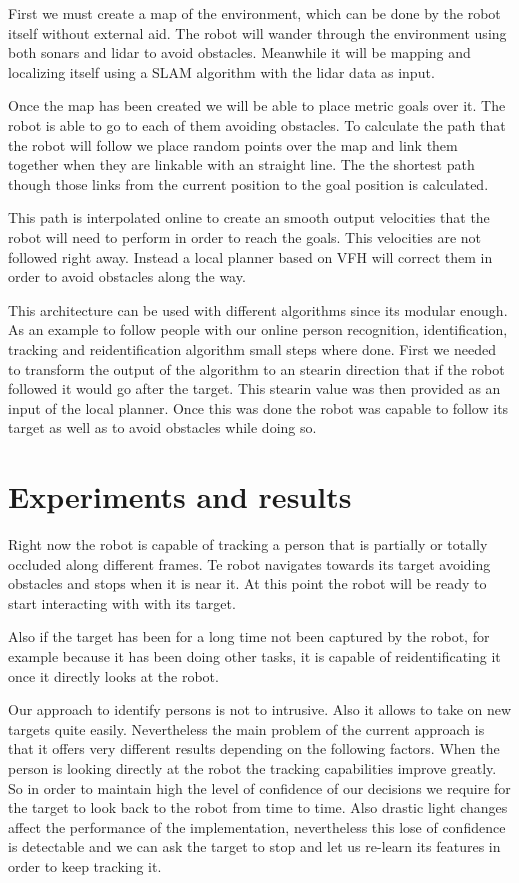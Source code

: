 First we must create a map of the environment, which can be done by the robot itself without external aid.
The robot will wander through the environment using both sonars and lidar to avoid obstacles.
Meanwhile it will be mapping and localizing itself using a SLAM algorithm with the lidar data as input.

Once the map has been created we will be able to place metric goals over it.
The robot is able to go to each of them avoiding obstacles.
To calculate the path that the robot will follow we place random points over the map and link them together when they are linkable with an straight line.
The the shortest path though those links from the current position to the goal position is calculated.

This path is interpolated online to create an smooth output velocities that the robot will need to perform in order to reach the goals.
This velocities are not followed right away.
Instead a local planner based on VFH will correct them in order to avoid obstacles along the way.

This architecture can be used with different algorithms since its modular enough.
As an example to follow people with our online person recognition, identification, tracking and reidentification algorithm small steps where done.
First we needed to transform the output of the algorithm to an stearin direction that if the robot followed it would go after the target.
This stearin value was then provided as an input of the local planner.
Once this was done the robot was capable to follow its target as well as to avoid obstacles while doing so.

\section{Experiments and results}
Right now the robot is capable of tracking a person that is partially or totally occluded along different frames.
Te robot navigates towards its target avoiding obstacles and stops when it is near it.
At this point the robot will be ready to start interacting with with its target.

Also if the target has been for a long time not been captured by the robot, for example because it has been doing other tasks, it is capable of reidentificating it once it directly looks at the robot.

Our approach to identify persons is not to intrusive.
Also it allows to take on new targets quite easily.
Nevertheless the main problem of the current approach is that it offers very different results depending on the following factors.
When the person is looking directly at the robot the tracking capabilities improve greatly.
So in order to maintain high the level of confidence of our decisions we require for the target to look back to the robot from time to time.
Also drastic light changes affect the performance of the implementation, nevertheless this lose of confidence is detectable and we can ask the target to stop and let us re-learn its features in order to keep tracking it.

